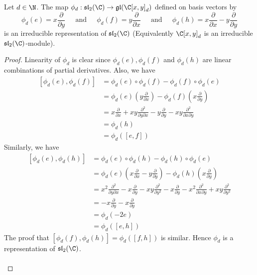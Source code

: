 \documentclass[a4paper]{article}
\begin{document}
\begin{prp}{}{} Let $d\in\N$. The map $\phi_d:\mathfrak{sl}_2(\C)\to\mathfrak{gl}(\C[x,y]_d)$ defined on basis vectors by $$\phi_d(e)=x\frac{\partial}{\partial y}\;\;\;\;\text{ and }\;\;\;\;\phi_d(f)=y\frac{\partial}{\partial x}\;\;\;\;\text{ and }\;\;\;\;\phi_d(h)=x\frac{\partial}{\partial x}-y\frac{\partial}{\partial y}$$ is an irreducible representation of $\mathfrak{sl}_2(\C)$ (Equivalently $\C[x,y]_d$ is an irreducible $\mathfrak{sl}_2(\C)$-module). \tcbline
\begin{proof}
Linearity of $\phi_d$ is clear since $\phi_d(e),\phi_d(f)$ and $\phi_d(h)$ are linear combinations of partial derivatives. Also, we have 
\begin{align*}
\left[\phi_d(e),\phi_d(f)\right]&=\phi_d(e)\circ\phi_d(f)-\phi_d(f)\circ\phi_d(e)\\
&=\phi_d(e)\left(y\frac{\partial}{\partial x}\right)-\phi_d(f)\left(x\frac{\partial}{\partial y}\right)\\
&=x\frac{\partial}{\partial x}+xy\frac{\partial^2}{\partial y\partial x}-y\frac{\partial}{\partial y}-xy\frac{\partial^2}{\partial x\partial y}\\
&=\phi_d(h)\\
&=\phi_d([e,f])
\end{align*}
Similarly, we have 
\begin{align*}
\left[\phi_d(e),\phi_d(h)\right]&=\phi_d(e)\circ\phi_d(h)-\phi_d(h)\circ\phi_d(e)\\
&=\phi_d(e)\left(x\frac{\partial}{\partial x}-y\frac{\partial}{\partial y}\right)-\phi_d(h)\left(x\frac{\partial}{\partial y}\right)\\
&=x^2\frac{\partial^2}{\partial y\partial x}-x\frac{\partial}{\partial y}-xy\frac{\partial^2}{\partial y^2}-x\frac{\partial}{\partial y}-x^2\frac{\partial^2}{\partial x\partial y}+xy\frac{\partial^2}{\partial y^2}\\
&=-x\frac{\partial}{\partial y}-x\frac{\partial}{\partial y}\\
&=\phi_d(-2e)\\
&=\phi_d([e,h])
\end{align*}
The proof that $\left[\phi_d(f),\phi_d(h)\right]=\phi_d([f,h])$ is similar. Hence $\phi_d$ is a representation of $\mathfrak{sl}_2(\C)$. \\~\\


\end{proof}
\end{prp}
\end{document}
